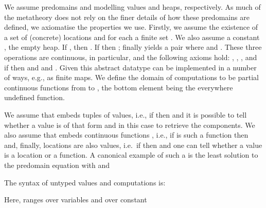 \documentclass[orivec]{llncs}
\newif\iffull\fullfalse
\renewcommand{\paragraph}[1]{\noindent {\bf #1}}
\newcommand{\squelch}[1]{}
\begin{document}
\paragraph{Denotational model} 
\iffull
A \emph{predomain} is an -cpo, i.e. a partial order with suprema
of ascending chains. A \emph{domain} is a predomain with a least element,
. \squelch{We use predomains and continuous functions, rather than sets
and functions, so as to be able to interpret recursive definitions.}
Recall that  is \emph{continuous} if it is monotone
 and preserves suprema of ascending
chains, i.e., . Any set is a predomain with the
discrete
order. If  is a set and  a predomain then
any  is continuous. A subset  of a
predomain  is \emph{admissible} if whenever  is an ascending
chain in  such that  for all , then ,
too. If  is continuous and  is a domain
then one defines  with
. One has,  and if
 is admissible and  then
, too. We denote a partial (continuous)
function from set (predomain)  to set (predomain)  by .  
\fi
We assume predomains  and  modelling values and heaps,
respectively. As much of the metatheory does not rely on the finer
details of how these predomains are defined, we axiomatise the
properties we use.  Firstly, we assume the existence of a set of
(concrete) locations  and for each  a finite
set . We also assume a constant
, the empty heap.  If , then . If  then ; finally  yields a pair 
where  and . These three operations
are continuous, in particular,  and the following axioms hold:
,
,
 , and if
 then
 and 
and .  Given  this abstract datatype can be
implemented in a number of ways, e.g., as finite maps.
We define the domain of computations  to be 
partial continuous functions from  to , the bottom element being the everywhere undefined function.

We assume that  embeds tuples of values, i.e., if
 then  and it is
possible to tell whether a value is of that form and in this case to
retrieve the components. We also assume that  embeds
continuous functions , i.e., if  is
such a function then  and, finally, locations are
also values, i.e.\ if  then  and
one can tell whether a value is a location or a function. A canonical
example of
such a  is the least solution to the predomain equation 
with  and


\paragraph{Syntax}
The syntax of untyped values and computations is:
\iffull

Here,  ranges over variables and  over constant
\else
\end{document}
